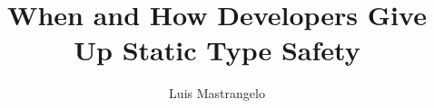 \documentclass[]{usiinfthesis}
\title{When and How \java{} Developers Give Up Static Type Safety} %
\author{Luis Mastrangelo} %
\begin{document}
\maketitle
\frontmatter


\tableofcontents 
\listoffigures
\listoftables
\listoflistings
\mainmatter





\appendix


\backmatter



\end{document}
